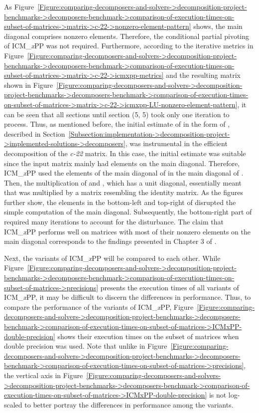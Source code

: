 As Figure~\ref{Figure:comparing-decomposers-and-solvers->decomposition-project-benchmarks->decomposers-benchmark->comparison-of-execution-times-on-subset-of-matrices->matrix->c-22->nonzero-element-pattern} shows, the main diagonal comprises nonzero elements.
Therefore, the conditional partial pivoting of ICM\_\textit{x}PP was not required.
Furthermore, according to the iterative metrics in Figure~\ref{Figure:comparing-decomposers-and-solvers->decomposition-project-benchmarks->decomposers-benchmark->comparison-of-execution-times-on-subset-of-matrices->matrix->c-22->icmxpp-metrics} and the resulting  matrix shown in Figure~\ref{Figure:comparing-decomposers-and-solvers->decomposition-project-benchmarks->decomposers-benchmark->comparison-of-execution-times-on-subset-of-matrices->matrix->c-22->icmxpp-LU-nonzero-element-pattern}, it can be seen that all sections until section (5, 5) took only one iteration to process.
Thus, as mentioned before, the initial estimate of  in the form of , described in Section~\ref{Subsection:implementation->decomposition-project->implemented-solutions->decomposers}, was instrumental in the efficient decomposition of the \textit{c-22} matrix.
In this case, the initial estimate was suitable since the input matrix mainly had elements on the main diagonal.
Therefore, ICM\_\textit{x}PP used the elements of the main diagonal of  in the main diagonal of .
Then, the multiplication of  and , which has a unit diagonal, essentially meant that  was multiplied by a matrix resembling the identity matrix.
As the figures further show, the elements in the bottom-left and top-right of  disrupted the simple computation of the main diagonal.
Subsequently, the bottom-right part of  required many iterations to account for the disturbance.
The claim that ICM\_\textit{x}PP performs well on matrices with most of their nonzero elements on the main diagonal corresponds to the findings presented in Chapter 3 of  \cite{Cejka2022}.

Next, the variants of ICM\_\textit{x}PP will be compared to each other.
While Figure~\ref{Figure:comparing-decomposers-and-solvers->decomposition-project-benchmarks->decomposers-benchmark->comparison-of-execution-times-on-subset-of-matrices->precisions} presents the execution times of all variants of ICM\_\textit{x}PP, it may be difficult to discern the differences in performance.
Thus, to compare the performance of the variants of ICM\_\textit{x}PP, Figure~\ref{Figure:comparing-decomposers-and-solvers->decomposition-project-benchmarks->decomposers-benchmark->comparison-of-execution-times-on-subset-of-matrices->ICMxPP-double-precision} shows their execution times on the subset of matrices when double precision was used.
Note that unlike in Figure~\ref{Figure:comparing-decomposers-and-solvers->decomposition-project-benchmarks->decomposers-benchmark->comparison-of-execution-times-on-subset-of-matrices->precisions}, the vertical axis in Figure~\ref{Figure:comparing-decomposers-and-solvers->decomposition-project-benchmarks->decomposers-benchmark->comparison-of-execution-times-on-subset-of-matrices->ICMxPP-double-precision} is not log-scaled to better portray the differences in performance among the variants.

